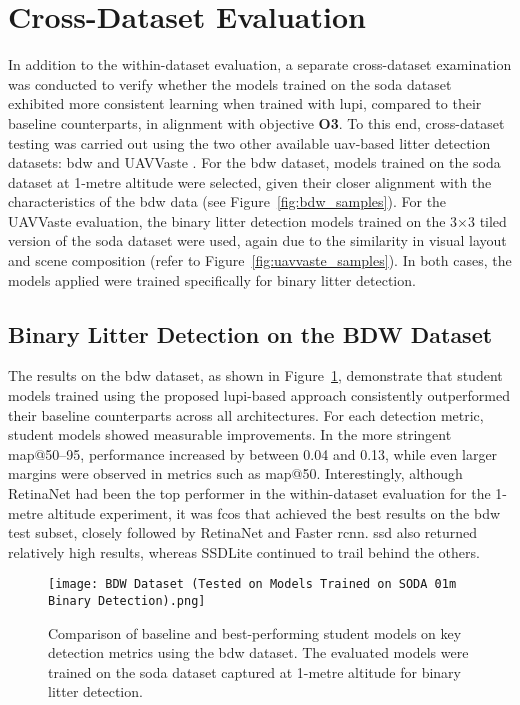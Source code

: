 \section{Cross-Dataset Evaluation}
\label{sec:5_cross_dataset_exp}

In addition to the within-dataset evaluation, a separate cross-dataset examination was conducted to verify whether the models trained on the \gls{soda} dataset exhibited more consistent learning when trained with \gls{lupi}, compared to their baseline counterparts, in alignment with objective \textbf{O3}. To this end, cross-dataset testing was carried out using the two other available \gls{uav}-based litter detection datasets: \gls{bdw} \cite{bdwdataset} and UAVVaste \cite{uavvaste}. For the \gls{bdw} dataset, models trained on the \gls{soda} dataset at 1-metre altitude were selected, given their closer alignment with the characteristics of the \gls{bdw} data (see Figure~\ref{fig:bdw_samples}). For the UAVVaste evaluation, the binary litter detection models trained on the 3$\times$3 tiled version of the \gls{soda} dataset were used, again due to the similarity in visual layout and scene composition (refer to Figure~\ref{fig:uavvaste_samples}). In both cases, the models applied were trained specifically for binary litter detection.

\subsection{Binary Litter Detection on the BDW Dataset}
\label{subsec:5_bdw_exp}

The results on the \gls{bdw} dataset, as shown in Figure~\ref{fig:bdw_bar}, demonstrate that student models trained using the proposed \gls{lupi}-based approach consistently outperformed their baseline counterparts across all architectures. For each detection metric, student models showed measurable improvements. In the more stringent \gls{map}@50--95, performance increased by between 0.04 and 0.13, while even larger margins were observed in metrics such as \gls{map}@50. Interestingly, although RetinaNet had been the top performer in the within-dataset evaluation for the 1-metre altitude experiment, it was \gls{fcos} that achieved the best results on the \gls{bdw} test subset, closely followed by RetinaNet and Faster \gls{rcnn}. \gls{ssd} also returned relatively high results, whereas SSDLite continued to trail behind the others.

\begin{figure}[!ht]
    \centering
    \texttt{[image: BDW Dataset (Tested on Models Trained on SODA 01m Binary Detection).png]}
    \caption{Comparison of baseline and best-performing student models on key detection metrics using the \gls{bdw} dataset. The evaluated models were trained on the \gls{soda} dataset captured at 1-metre altitude for binary litter detection.}
    \label{fig:bdw_bar}
\end{figure}

